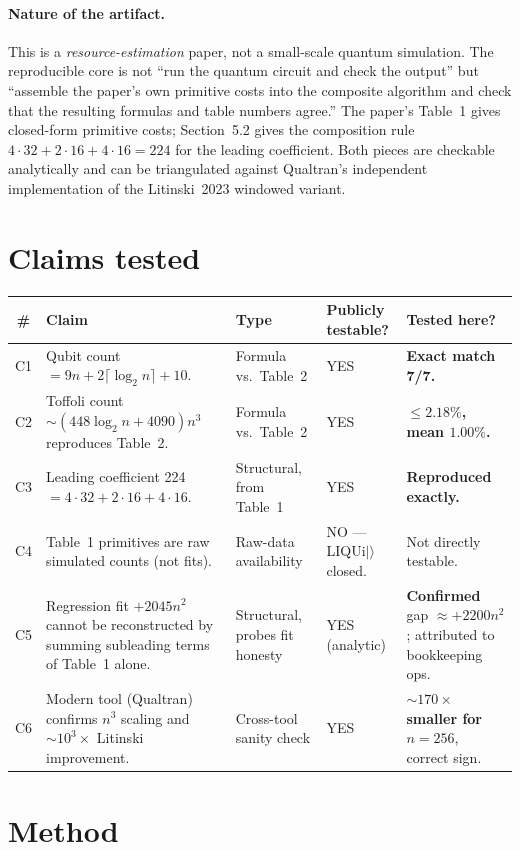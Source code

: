 \documentclass[11pt]{article}
\begin{document}
\paragraph{Nature of the artifact.} This is a \emph{resource-estimation} paper,
not a small-scale quantum simulation. The reproducible core is not
``run the quantum circuit and check the output'' but ``assemble the paper's own
primitive costs into the composite algorithm and check that the resulting
formulas and table numbers agree.'' The paper's Table~1 gives closed-form
primitive costs; Section~5.2 gives the composition rule
$4 \cdot 32 + 2 \cdot 16 + 4 \cdot 16 = 224$ for the leading coefficient. Both
pieces are checkable analytically and can be triangulated against Qualtran's
independent implementation of the Litinski~2023 windowed variant.

\section{Claims tested}

\begin{longtable}{clp{3.5cm}p{2.5cm}p{2.8cm}}
\toprule
\# & Claim & Type & Publicly testable? & Tested here? \\
\midrule
C1 & Qubit count $= 9n + 2\lceil\log_2 n\rceil + 10$. & Formula vs.\ Table~2 & YES & \textbf{Exact match 7/7.} \\
C2 & Toffoli count $\sim (448 \log_2 n + 4090) n^3$ reproduces Table~2. & Formula vs.\ Table~2 & YES & \textbf{$\le 2.18\%$, mean $1.00\%$.} \\
C3 & Leading coefficient 224 $= 4\cdot 32 + 2\cdot 16 + 4\cdot 16$. & Structural, from Table~1 & YES & \textbf{Reproduced exactly.} \\
C4 & Table~1 primitives are raw simulated counts (not fits). & Raw-data availability & NO --- LIQUi$|\rangle$ closed. & Not directly testable. \\
C5 & Regression fit $+2045 n^2$ cannot be reconstructed by summing subleading terms of Table~1 alone. & Structural, probes fit honesty & YES (analytic) & \textbf{Confirmed} gap $\approx +2200 n^2$; attributed to bookkeeping ops. \\
C6 & Modern tool (Qualtran) confirms $n^3$ scaling and $\sim 10^3\times$ Litinski improvement. & Cross-tool sanity check & YES & \textbf{$\sim 170\times$ smaller for $n=256$}, correct sign. \\
\bottomrule
\end{longtable}

\section{Method}
\end{document}
